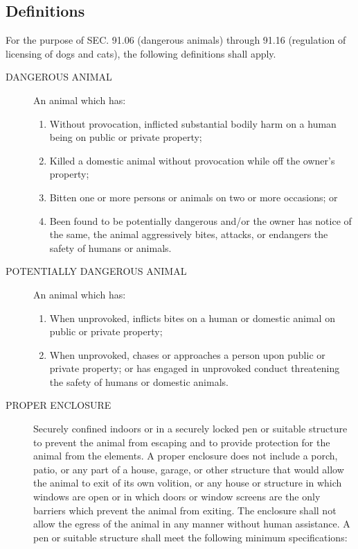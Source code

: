 \subsection{Definitions}
For the purpose of SEC. 91.06 (dangerous animals) through 91.16 (regulation of licensing of dogs and cats), the following definitions shall apply.
\begin{description}
    \item[DANGEROUS ANIMAL] An animal which has:
    \begin{enumerate}
        \item Without provocation, inflicted substantial bodily harm on a human being on public or private property;
        \item Killed a domestic animal without provocation while off the owner’s property;
        \item Bitten one or more persons or animals on two or more occasions; or
        \item Been found to be potentially dangerous and/or the owner has notice of the same, the animal aggressively bites, attacks, or endangers the safety of humans or animals.
    \end{enumerate}
    \item[POTENTIALLY DANGEROUS ANIMAL]  An animal which has:
    \begin{enumerate}
        \item When unprovoked, inflicts bites on a human or domestic animal on public or private property;
        \item When unprovoked, chases or approaches a person upon public or private property; or has engaged in unprovoked conduct threatening the safety of humans or domestic animals.
    \end{enumerate}
    \item[PROPER ENCLOSURE]  Securely confined indoors or in a securely locked pen or suitable structure to prevent the animal from escaping and to provide protection for the animal from the elements.  A proper enclosure does not include a porch, patio, or any part of a house, garage, or other structure that would allow the animal to exit of its own volition, or any house or structure in which windows are open or in which doors or window screens are the only barriers which prevent the animal from exiting.  The enclosure shall not allow the egress of the animal in any manner without human assistance.  A pen or suitable structure shall meet the following minimum specifications:
    \begin{enumerate}

\end{enumerate}
\end{description}
